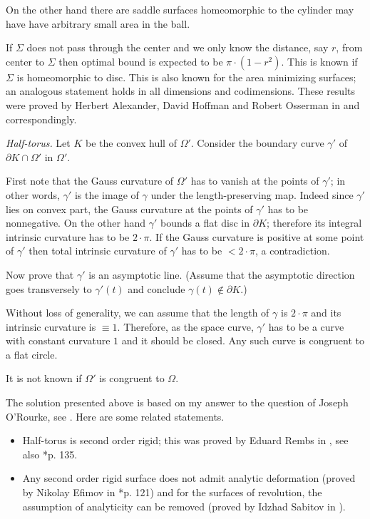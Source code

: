 On the other hand there are saddle surfaces homeomorphic to the cylinder
may have have arbitrary small area in the ball. 

If $\Sigma$ does not pass through the center 
and we only know the distance, say $r$, 
from center to $\Sigma$ 
then optimal bound is expected to be $\pi\cdot(1-r^2)$.
This is known if $\Sigma$ is homeomorphic to  disc.
This is also known for the area minimizing surfaces;
an analogous statement
holds in all dimensions and codimensions.
These results were proved by 
Herbert Alexander, 
David Hoffman
and Robert Osserman in \cite{alexander-osserman} and \cite{alexander-hoffman-osserman} correspondingly.






\textit{Half-torus.}
Let $K$ be the convex hull of $\Omega'$.
Consider the boundary curve $\gamma'$ of $\partial K\cap \Omega'$ in $\Omega'$.

First note that the Gauss curvature of $\Omega'$ has to vanish at the points of $\gamma'$;
in other words, $\gamma'$ is the image of $\gamma$ 
under the length-preserving map.
Indeed since $\gamma'$ lies on convex part, 
the Gauss curvature at the points of $\gamma'$ has to be nonnegative. 
On the other hand $\gamma'$ bounds a flat disc in $\partial K$;
therefore its integral intrinsic curvature has to be $2{\cdot}\pi$.
If the Gauss curvature is positive at some point of $\gamma'$ then total intrinsic curvature of $\gamma'$ has to be $<2{\cdot}\pi$, a contradiction.

Now prove that $\gamma'$ is an asymptotic line.
(Assume that the asymptotic direction goes transversely to $\gamma'(t)$ and conclude $\gamma(t)\notin\partial K$.)

Without loss of generality, we can assume that the length of $\gamma$ is $2{\cdot}\pi$ and its intrinsic curvature is $\equiv 1$.
Therefore, as the space curve,
$\gamma'$ has to be a curve with constant curvature $1$ and it should be closed.
Any such curve is congruent to a flat circle.

 It is not known if $\Omega'$ is congruent to $\Omega$.

The solution presented above is based on my answer 
to the question of Joseph O'Rourke, see \cite{rourke}.
Here are some related statements.
\begin{itemize}
\item Half-torus is second order rigid;
this was proved by Eduard Rembs in
\cite{rembs}, see also \cite{efimov}*{p. 135}.
\item Any second order rigid surface does not admit analytic deformation (proved by Nikolay Efimov in \cite{efimov}*{p. 121})
and for the surfaces of revolution, the assumption of analyticity can be removed (proved by Idzhad Sabitov in \cite{sabitov}).
\end{itemize}






